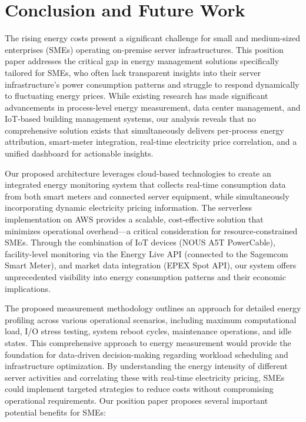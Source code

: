 


\section{Conclusion and Future Work}
The rising energy costs present a significant challenge for small and medium-sized enterprises (SMEs)
operating on-premise server infrastructures. This position paper addresses the critical gap in
energy management solutions specifically tailored for SMEs, who often lack transparent insights
into their server infrastructure's power consumption patterns and struggle to respond dynamically
to fluctuating energy prices. While existing research has made significant advancements in
process-level energy measurement, data center management, and IoT-based building management systems,
our analysis reveals that no comprehensive solution exists that simultaneously delivers
per-process energy attribution, smart-meter integration, real-time electricity price correlation,
and a unified dashboard for actionable insights.

Our proposed architecture leverages cloud-based technologies to create an integrated energy
monitoring system that collects real-time consumption data from both smart meters and connected
server equipment, while simultaneously incorporating dynamic electricity pricing information.
The serverless implementation on AWS provides a scalable, cost-effective solution that minimizes
operational overhead—a critical consideration for resource-constrained SMEs. Through the
combination of IoT devices (NOUS A5T PowerCable), facility-level monitoring via the Energy Live API
(connected to the Sagemcom Smart Meter), and market data integration (EPEX Spot API), our system
offers unprecedented visibility into energy consumption patterns and their economic implications.

The proposed measurement methodology outlines an approach for detailed energy profiling across
various operational scenarios, including maximum computational load, I/O stress testing, system
reboot cycles, maintenance operations, and idle states. This comprehensive approach to energy
measurement would provide the foundation for data-driven decision-making regarding workload
scheduling and infrastructure optimization. By understanding the energy intensity of different
server activities and correlating these with real-time electricity pricing, SMEs could implement
targeted strategies to reduce costs without compromising operational requirements. Our position
paper proposes several important potential benefits for SMEs:

